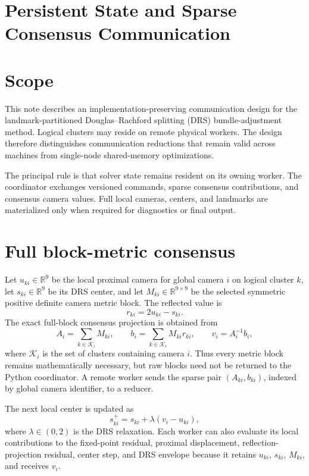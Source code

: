 \section{Persistent State and Sparse Consensus Communication}

\section{Scope}

This note describes an implementation-preserving communication design for the
landmark-partitioned Douglas--Rachford splitting (DRS) bundle-adjustment method.
Logical clusters may reside on remote physical workers.  The design therefore
distinguishes communication reductions that remain valid across machines from
single-node shared-memory optimizations.

The principal rule is that solver state remains resident on its owning worker.
The coordinator exchanges versioned commands, sparse consensus contributions,
and consensus camera values.  Full local cameras, centers, and landmarks are
materialized only when required for diagnostics or final output.

\section{Full block-metric consensus}

Let $u_{ki}\in\mathbb{R}^9$ be the local proximal camera for global camera $i$
on logical cluster $k$, let $s_{ki}\in\mathbb{R}^9$ be its DRS center, and let
$M_{ki}\in\mathbb{R}^{9\times9}$ be the selected symmetric positive definite
camera metric block.  The reflected value is
\begin{equation}
  r_{ki}=2u_{ki}-s_{ki}.
\end{equation}
The exact full-block consensus projection is obtained from
\begin{equation}
  A_i=\sum_{k\in\mathcal K_i}M_{ki},
  \qquad
  b_i=\sum_{k\in\mathcal K_i}M_{ki}r_{ki},
  \qquad
  v_i=A_i^{-1}b_i,
\end{equation}
where $\mathcal K_i$ is the set of clusters containing camera $i$.  Thus every
metric block remains mathematically necessary, but raw blocks need not be
returned to the Python coordinator.  A remote worker sends the sparse pair
$(A_{ki},b_{ki})$, indexed by global camera identifier, to a reducer.

The next local center is updated as
\begin{equation}
  s_{ki}^{+}=s_{ki}+\lambda(v_i-u_{ki}),
\end{equation}
where $\lambda\in(0,2)$ is the DRS relaxation.  Each worker can also evaluate
its local contributions to the fixed-point residual, proximal displacement,
reflection-projection residual, center step, and DRS envelope because it retains
$u_{ki}$, $s_{ki}$, $M_{ki}$, and receives $v_i$.


